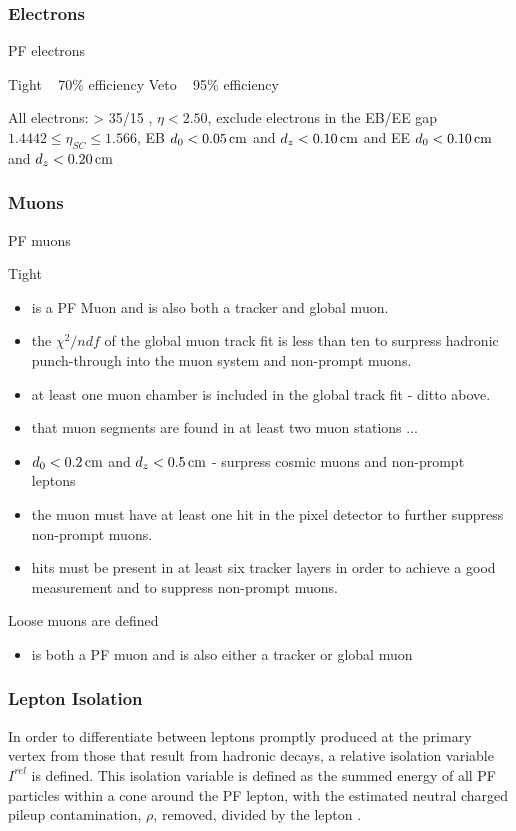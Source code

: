 \subsubsection{Electrons}
PF electrons

Tight ~ 70\% efficiency
Veto ~ 95\% efficiency


All electrons: \pT > 35/15 \GeVc, $\eta < 2.50$, exclude electrons in the EB/EE gap $1.4442 \leq \eta_{SC} \leq 1.566$, EB $d_{0} < 0.05\,\text{cm}$ and $d_{z} < 0.10\,\text{cm}$ and EE $d_{0} < 0.10\,\text{cm}$ and $d_{z} < 0.20\,\text{cm}$

\subsubsection{Muons}
PF muons 

Tight 

\begin{itemize}
\item is a PF Muon and is also both a tracker and global muon.
\item the $\chi^{2}/ndf$ of the global muon track fit is less than ten to surpress hadronic punch-through into the muon system and non-prompt muons.
\item at least one muon chamber is included in the global track fit - ditto above.
\item that muon segments are found in at least two muon stations ...
\item $d_{0} < 0.2\,\text{cm}$ and $d_{z} < 0.5\,\text{cm}$ - surpress cosmic muons and non-prompt leptons
\item the muon must have at least one hit in the pixel detector to further suppress non-prompt muons.
\item hits must be present in at least six tracker layers in order to achieve a good \pT measurement and to suppress non-prompt muons.
\end{itemize}

Loose muons are defined 
\begin{itemize}
\item is both a PF muon and is also either a tracker or global muon
\end{itemize}

\cite{Chatrchyan:2012xi}


\subsubsection{Lepton Isolation}
In order to differentiate between leptons promptly produced at the primary vertex from those that result from hadronic decays, a relative isolation variable $I^{rel}$ is defined.
This isolation variable is defined as the summed energy of all PF particles within a cone around the PF lepton, with the estimated neutral charged pileup contamination, $\rho$, removed, divided by the lepton \pT.

